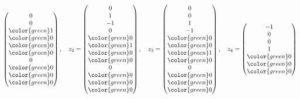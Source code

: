 \begin{loesung}
\[\begin{pmatrix}
              0\\
              0\\
\color{green} 1\\
\color{green} 0\\
\color{green} 0\\
\color{green} 0\\
              0\\
\color{green} 0\\
\color{green} 0\\
\color{green} 0
\end{pmatrix}
,\quad
z_2=\begin{pmatrix}
              0\\
              1\\
             -1\\
              0\\
\color{green} 0\\
\color{green} 1\\
\color{green} 0\\
\color{green} 0\\
              0\\
\color{green} 0\\
\color{green} 0\\
\color{green} 0
\end{pmatrix}
,\quad
z_3=\begin{pmatrix}
              0\\
              0\\
              1\\
             -1\\
\color{green} 0\\
\color{green} 0\\
\color{green} 1\\
\color{green} 0\\
              0\\
\color{green} 0\\
\color{green} 0\\
\color{green} 0
\end{pmatrix}
,\quad
z_4=\begin{pmatrix}
             -1\\
              0\\
              0\\
              1\\
\color{green} 0\\
\color{green} 0\\
\color{green} 0\\

\end{pmatrix}\]
\end{loesung}
